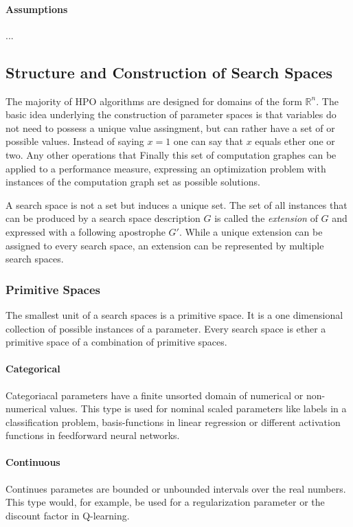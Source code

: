 \documentclass[english]{article}
\begin{document}
\paragraph{Assumptions}
...

\subsection{Structure and Construction of Search Spaces}
The majority of \ac{HPO} algorithms are designed for domains of the form $\mathbb{R}^n$.
The basic idea underlying the construction of parameter spaces is that variables do not need to possess a unique value assingment, but can rather have a set of or possible values. Instead of saying $x = 1$ one can say that $x$ equals ether one or two. Any other operations that Finally this set of computation graphes can be applied to a performance measure, expressing an optimization problem with instances of the computation graph set as possible solutions.

A search space is not a set but induces a unique set. The set of all instances that can be produced by a search space description $G$ is called the \textit{extension} of $G$ and expressed with a following apostrophe $G'$. While a unique extension can be assigned to every search space, an extension can be represented by multiple search spaces.

\subsubsection{Primitive Spaces}
The smallest unit of a search spaces is a primitive space. It is a one dimensional collection of possible instances of a parameter. Every search space is ether a primitive space of a combination of primitive spaces.

\paragraph{Categorical}
Categoriacal parameters have a finite unsorted domain of numerical or non-numerical values. This type is used for nominal scaled parameters like labels in a classification problem, basis-functions in linear regression or different activation functions in feedforward neural networks.

\paragraph{Continuous}
Continues parametes are bounded or unbounded intervals over the real numbers. This type would, for example, be used for a regularization parameter or the discount factor in Q-learning.
\end{document}
